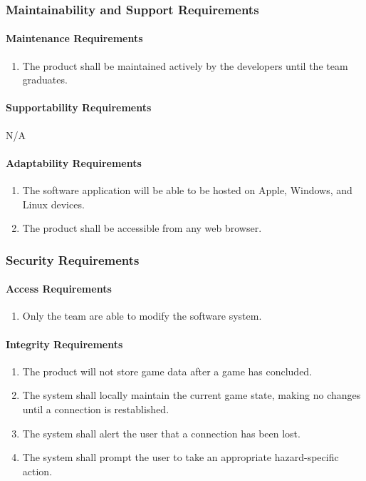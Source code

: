 \documentclass[12pt]{article}
\begin{document}
{\subsubsection{Maintainability and Support Requirements}
\label{NFR_MS}
\paragraph{Maintenance Requirements}
\begin{enumerate}[{MS}1., leftmargin=2\parindent]
    \item The product shall be maintained actively by the developers until the \progname{} team graduates.
\end{enumerate}

\paragraph{Supportability Requirements}
N/A

\paragraph{Adaptability Requirements}
\begin{enumerate}[{MS}1., leftmargin=2\parindent, resume]
    \item The software application will be able to be hosted on Apple, Windows, and Linux devices.
    \item The product shall be accessible from any web browser.
\end{enumerate}



\subsubsection{Security Requirements}
\label{NFR_SR}
\paragraph{Access Requirements}
\begin{enumerate}[{SR}1., leftmargin=2\parindent]
    \item Only the \progname{} team are able to modify the software system.
\end{enumerate}

\paragraph{Integrity Requirements}
\begin{enumerate}[{SR}1., leftmargin=2\parindent, resume]
    \item The product will not store game data after a game has concluded.
    \item The system shall locally maintain the current game state, making no changes until a connection is restablished.
    \item The system shall alert the user that a connection has been lost.
    \item The system shall prompt the user to take an appropriate hazard-specific action.
\end{enumerate}

}
\end{document}
